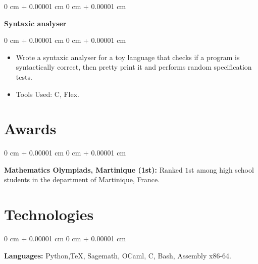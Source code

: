 \documentclass[10pt, letterpaper]{article}
\newenvironment{highlights}{
    \begin{itemize}[
        topsep=0.10 cm,
        parsep=0.10 cm,
        partopsep=0pt,
        itemsep=0pt,
        leftmargin=0 cm + 10pt
    ]
}{
    \end{itemize}
} %
\newenvironment{onecolentry}{
    \begin{adjustwidth}{
        0 cm + 0.00001 cm
    }{
        0 cm + 0.00001 cm
    }
}{
    \end{adjustwidth}
} %
\newenvironment{twocolentry}[2][]{
    \onecolentry
    \def\secondColumn{#2}
    \setcolumnwidth{\fill, 4.5 cm}
    \begin{paracol}{2}
}{
    \switchcolumn \raggedleft \secondColumn
    \end{paracol}
    \endonecolentry
} %
\begin{document}
        \vspace{0.2 cm}
        
        \begin{twocolentry}{
            \href{}{}
        }
            \textbf{Syntaxic analyser}\end{twocolentry}

        \vspace{0.10 cm}
        \begin{onecolentry}
            \begin{highlights}
                \item Wrote a syntaxic analyser for a toy language that checks if a program is syntactically correct, then pretty print it and performs random specification tests.
                \item Tools Used: C, Flex.
            \end{highlights}
        \end{onecolentry}

        \vspace{0.2 cm}

    \section{Awards}
        
        \begin{onecolentry}
            \textbf{Mathematics Olympiads, Martinique (1st):} Ranked $1$st among high school students in the department of Martinique, France.
        \end{onecolentry}
    
    \section{Technologies}
        
        \begin{onecolentry}
            \textbf{Languages:} Python,\TeX, Sagemath, OCaml, C, Bash, Assembly x86-64.
        \end{onecolentry}
    
\end{document}
